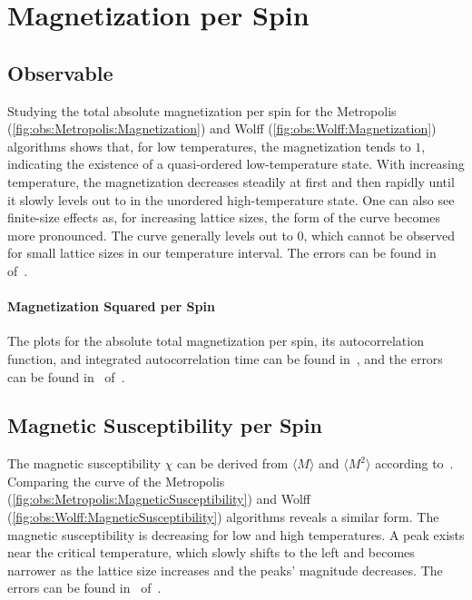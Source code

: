 \section{Magnetization per Spin}\label{sec:res:magnet}
	\subsection{Observable}\label{sec:res:magnet:observable}
		Studying the total absolute magnetization per spin for the Metropolis (\cref{fig:obs:Metropolis:Magnetization}) and Wolff (\cref{fig:obs:Wolff:Magnetization}) algorithms shows that, for low temperatures, the magnetization tends to $1$, indicating the existence of a quasi-ordered low-temperature state. With increasing temperature, the magnetization decreases steadily at first and then rapidly until it slowly levels out to in the unordered high-temperature state. One can also see finite-size effects as, for increasing lattice sizes, the form of the curve becomes more pronounced. The curve generally levels out to $0$, which cannot be observed for small lattice sizes in our temperature interval. The errors can be found in~ of~.
		
		\paragraph{Magnetization Squared per Spin}\label{sec:res:magnetsquare} The plots for the absolute total magnetization per spin, its autocorrelation function, and integrated autocorrelation time can be found in~, and the errors can be found in~ of~.
	
	\subsection{Magnetic Susceptibility per Spin}\label{sec:res:xs}
		The magnetic susceptibility $\chi$ can be derived from $\langle M \rangle$ and $\langle M^2 \rangle$ according to~.  Comparing the curve of the Metropolis (\cref{fig:obs:Metropolis:MagneticSusceptibility}) and Wolff (\cref{fig:obs:Wolff:MagneticSusceptibility}) algorithms reveals a similar form. The magnetic susceptibility is decreasing for low and high temperatures. A peak exists near the critical temperature, which slowly shifts to the left and becomes narrower as the lattice size increases and the peaks' magnitude decreases. The errors can be found in~ of~.
		
